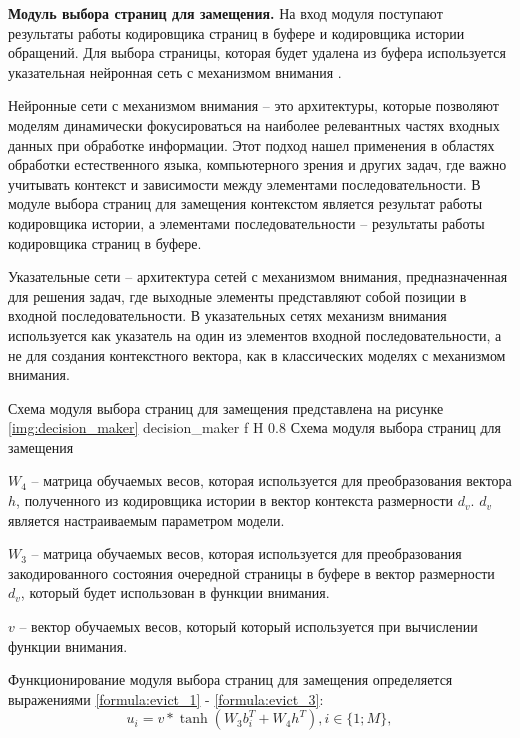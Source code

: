 \textbf{Модуль выбора страниц для замещения.}
На вход модуля поступают результаты работы кодировщика страниц в буфере и кодировщика истории обращений.
Для выбора страницы, которая будет удалена из буфера используется указательная нейронная сеть с механизмом внимания \cite{vinyals2015pointer}.

Нейронные сети с механизмом внимания -- это архитектуры, которые позволяют моделям динамически фокусироваться на наиболее релевантных частях входных данных при обработке информации.
Этот подход нашел применения в областях обработки естественного языка, компьютерного зрения и других задач, где важно учитывать контекст и зависимости между элементами последовательности.
В модуле выбора страниц для замещения контекстом является результат работы кодировщика истории, а элементами последовательности -- результаты работы кодировщика страниц в буфере.

Указательные сети -- архитектура сетей с механизмом внимания, предназначенная для решения задач, где выходные элементы представляют собой позиции в входной последовательности.
В указательных сетях механизм внимания используется как указатель на один из элементов входной последовательности, а не для создания контекстного вектора, как в классических моделях с механизмом внимания.

Схема модуля выбора страниц для замещения представлена на рисунке \ref{img:decision_maker}
{decision_maker} %
{f} %
{H} %
{0.8\textwidth} %
{Схема модуля выбора страниц для замещения} %

$W_4$ -- матрица обучаемых весов, которая используется для преобразования вектора $h$, полученного из кодировщика истории в вектор контекста размерности $d_v$. $d_v$ является настраиваемым параметром модели.

$W_3$ -- матрица обучаемых весов, которая используется для преобразования закодированного состояния очередной страницы в буфере в вектор размерности $d_v$, который будет использован в функции внимания.

$v$ -- вектор обучаемых весов, который который используется при вычислении функции внимания.

Функционирование модуля выбора страниц для замещения определяется выражениями \ref{formula:evict_1} - \ref{formula:evict_3}:
\begin{equation}\label{formula:evict_1}
	u_i = v * \tanh(W_3 b_i^T + W_4 h^T), i \in \{1; M\},
\end{equation}

